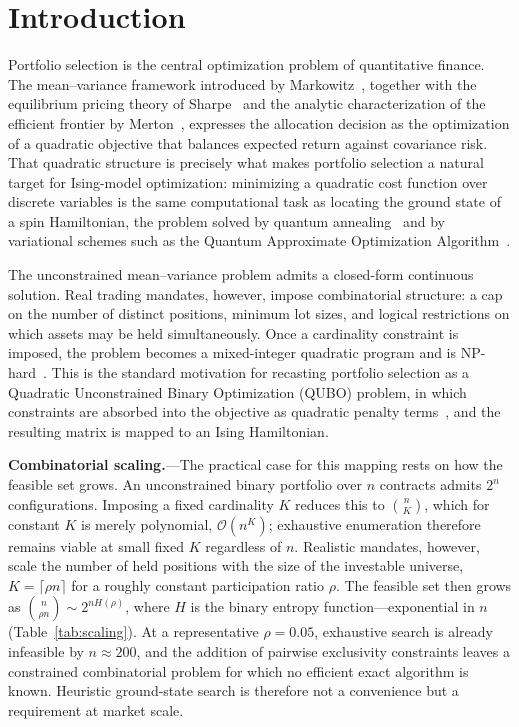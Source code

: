 \documentclass[aps, reprint, prl, twocolumn, superscriptaddress,amsmath,amssymb,noeprint]{revtex4-2}
\begin{document}
\section{Introduction}

Portfolio selection is the central optimization problem of quantitative
finance.  The mean--variance framework introduced by
Markowitz~\cite{markowitz1952}, together with the equilibrium pricing
theory of Sharpe~\cite{sharpe1964} and the analytic characterization of
the efficient frontier by Merton~\cite{merton1972}, expresses the
allocation decision as the optimization of a quadratic objective that
balances expected return against covariance risk.  That quadratic
structure is precisely what makes portfolio selection a natural target
for Ising-model optimization: minimizing a quadratic cost function over
discrete variables is the same computational task as locating the ground
state of a spin Hamiltonian, the problem solved by quantum
annealing~\cite{kadowaki1998,johnson2011} and by variational schemes such
as the Quantum Approximate Optimization Algorithm~\cite{farhi2014}.

The unconstrained mean--variance problem admits a closed-form continuous
solution.  Real trading mandates, however, impose combinatorial
structure: a cap on the number of distinct positions, minimum lot sizes,
and logical restrictions on which assets may be held simultaneously.
Once a cardinality constraint is imposed, the problem becomes a
mixed-integer quadratic program and is
NP-hard~\cite{bienstock1996,bertsimas2009}.  This is the standard
motivation for recasting portfolio selection as a Quadratic Unconstrained
Binary Optimization (QUBO) problem, in which constraints are absorbed
into the objective as quadratic penalty
terms~\cite{lucas2014,glover2019}, and the resulting matrix is mapped to
an Ising Hamiltonian.

\textbf{Combinatorial scaling.}---The practical case for this mapping
rests on how the feasible set grows.  An unconstrained binary portfolio
over $n$ contracts admits $2^n$ configurations.  Imposing a fixed
cardinality $K$ reduces this to $\binom{n}{K}$, which for constant $K$ is
merely polynomial, $\mathcal{O}(n^K)$; exhaustive enumeration therefore
remains viable at small fixed $K$ regardless of $n$.  Realistic mandates,
however, scale the number of held positions with the size of the
investable universe, $K = \lceil \rho n \rceil$ for a roughly constant
participation ratio $\rho$.  The feasible set then grows as
$\binom{n}{\rho n} \sim 2^{n H(\rho)}$, where $H$ is the binary entropy
function---exponential in $n$ (Table~\ref{tab:scaling}).  At a
representative $\rho = 0.05$, exhaustive search is already infeasible by
$n \approx 200$, and the addition of pairwise exclusivity constraints
leaves a constrained combinatorial problem for which no efficient exact
algorithm is known.  Heuristic ground-state search is therefore not a
convenience but a requirement at market scale.
\end{document}

